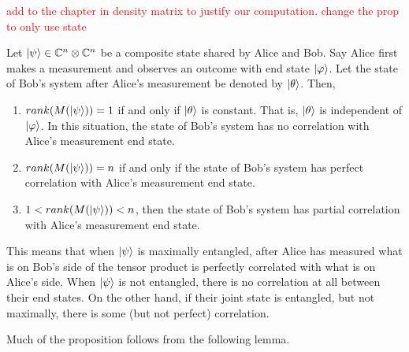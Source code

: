 
\textcolor{red}{add to the chapter in density matrix to justify our computation. change the prop to only use state}
\begin{prop}
\label{entanglement-rank}
Let $\ket{\psi} \in \mathbb{C}^n \otimes \mathbb{C}^{n}$ be a composite state shared by Alice and Bob. Say Alice first makes a measurement and observes an outcome with end state $\ket{\varphi}$. Let the state of Bob's system after Alice's measurement be denoted by $\ket{\theta}$. Then,
\begin{enumerate}
    \item $rank(M(\ket{\psi}))=1$ if and only if $\ket{\theta}$ is constant.  That is, $\ket{\theta}$ is independent of $\ket{\varphi}$. In this situation, the state of Bob's system has no correlation with Alice's measurement end state.
    \item $rank(M(\ket{\psi}))=n$ if and only if the state of Bob's system has perfect correlation with Alice's measurement end state.
    \item $1<rank(M(\ket{\psi}))<n$, then the state of Bob's system has partial correlation with Alice's measurement end state.
\end{enumerate}
\end{prop}

This means that when $\ket{\psi}$ is maximally entangled, after Alice has measured what is on Bob's side of the tensor product is perfectly correlated with what is on Alice's side.  When $\ket{\psi}$ is not entangled, there is no correlation at all between their end states.  On the other hand, if their joint state is entangled, but not maximally, there is some (but not perfect) correlation.  

Much of the proposition follows from the following lemma.  




